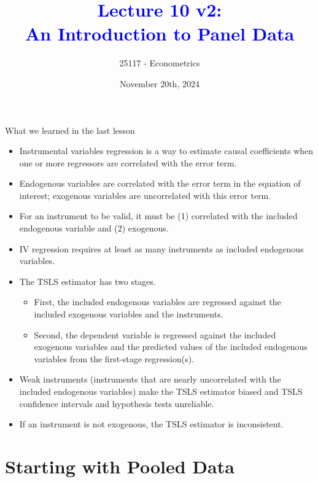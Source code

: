 \documentclass[notes,10pt, aspectratio=169]{beamer}
\title[]{\textcolor{blue}{Lecture 10 v2:\\An Introduction to Panel Data}}
\author{25117 - Econometrics}
\institute[shortinst]{Universitat Pompeu Fabra}
\date{November 20th, 2024}
\begin{document}
\begin{frame}[plain]
\maketitle
\end{frame}



\begin{frame}{What we learned in the last lesson}

\begin{itemize}
    \item Instrumental variables regression is a way to estimate causal coefficients when one or more regressors are correlated with the error term.
    \item  Endogenous variables are correlated with the error term in the equation of interest; exogenous variables are uncorrelated with this error term.
    \item  For an instrument to be valid, it must be (1) correlated with the included endogenous variable and (2) exogenous.
    \item  IV regression requires at least as many instruments as included endogenous variables.
    \item The TSLS estimator has two stages.
\begin{itemize}
    \item First, the included endogenous variables are regressed against the included exogenous variables and the instruments.
    \item Second, the dependent variable is regressed against the included exogenous variables and the predicted values of the included endogenous variables from the first-stage regression(s).
\end{itemize}
    \item Weak instruments (instruments that are nearly uncorrelated with the included endogenous variables) make the TSLS estimator biased and TSLS confidence intervals and hypothesis tests unreliable.
    \item If an instrument is not exogenous, the TSLS estimator is inconsistent.
\end{itemize}

\end{frame}


\section{Starting with Pooled Data}
\end{document}
